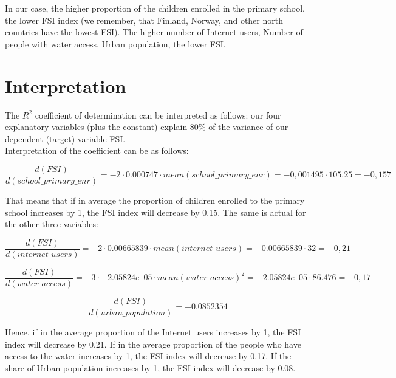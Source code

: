\documentclass{article}
\begin{document}
In our case, the higher proportion of the children enrolled in the primary school, the lower FSI index (we remember, that Finland, Norway, and other north countries have the lowest FSI). The higher number of Internet users, Number of people with water access, Urban population, the lower FSI. 

\section{Interpretation}

The $R^2$ coefficient of determination can be interpreted as follows: our four explanatory variables (plus the constant) explain 80\% of the variance of our dependent (target) variable FSI. \\

Interpretation of the coefficient can be as follows: 

$$ \frac{d(FSI)}{d(school\_primary\_enr)} = -2 \cdot 0.000747 \cdot mean(school\_primary\_enr) = -0,001495 \cdot 105.25 = -0,157$$

That means that if in average the proportion of children enrolled to the primary school increases by 1, the FSI index will decrease by 0.15. The same is actual for the other three variables: 

$$ \frac{d(FSI)}{d(internet\_users)} = -2 \cdot 0.00665839 \cdot mean(internet\_users) = 
-0.00665839 \cdot 32  = -0,21$$

$$ \frac{d(FSI)}{d(water\_access)} = -3 \cdot − 2.05824e–05 \cdot mean(water\_access)^2 = -2.05824e–05 \cdot 86.476 = -0,17$$

$$ \frac{d(FSI)}{d(urban\_population)} = - 0.0852354$$

Hence, if in the average proportion of the Internet users increases by 1, the FSI index will decrease by 0.21. If in the average proportion of the people who have access to the water increases by 1, the FSI index will decrease by 0.17. If the share of Urban population increases by 1, the FSI index will decrease by 0.08.
\end{document}
